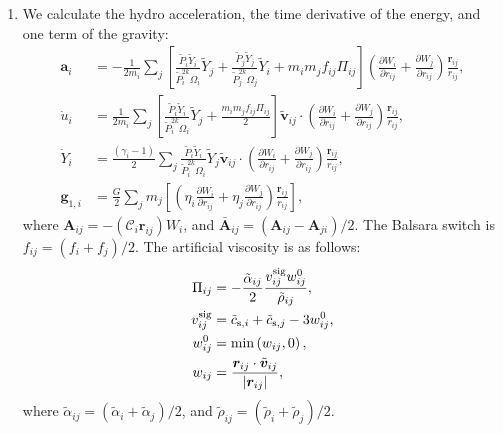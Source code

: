 \documentclass[fleqn,dvipdfmx]{article}
\begin{document}
\begin{enumerate}
\item We calculate the hydro acceleration, the time derivative of the
  energy, and one term of the gravity:
  \begin{align}
    \bm{a}_i &= - \frac{1}{2m_i} \sum_j \left[ \frac{\tilde{P}_i
        \tilde{Y}_i}{\tilde{P}_i^{2k} \Omega_i} \tilde{Y}_j +
      \frac{\tilde{P}_j \tilde{Y}_j}{\tilde{P}_j^{2k} \Omega_j}
      \tilde{Y}_i + m_i m_j f_{ij} \Pi_{ij} \right] \left(
    \frac{\partial W_i}{\partial r_{ij}} + \frac{\partial
      W_j}{\partial r_{ij}} \right) \frac{\bm{r}_{ij}}{r_{ij}}, \\
    \dot{u}_i &= \frac{1}{2m_i} \sum_j \left[ \frac{\tilde{P}_i
        \tilde{Y}_i}{\tilde{P}_i^{2k} \Omega_i} \tilde{Y}_j +
      \frac{m_i m_j f_{ij} \Pi_{ij}}{2} \right] \tilde{\bm{v}}_{ij}
    \cdot \left( \frac{\partial W_i}{\partial r_{ij}} + \frac{\partial
      W_j}{\partial r_{ij}} \right) \frac{\bm{r}_{ij}}{r_{ij}}, \\
    \dot{Y}_i &= \frac{(\gamma_i - 1)}{2} \sum_j \frac{\tilde{P}_i
      \tilde{Y}_i}{\tilde{P}_i^{2k} \Omega_i} \tilde{Y}_j
    \tilde{\bm{v}}_{ij} \cdot \left( \frac{\partial W_i}{\partial
      r_{ij}} + \frac{\partial W_j}{\partial r_{ij}} \right)
    \frac{\bm{r}_{ij}}{r_{ij}}, \\
    \bm{g}_{1,i} &= \frac{G}{2} \sum_j m_j \left[ \left( \eta_i
      \frac{\partial W_{i}}{\partial r_{ij}} + \eta_j \frac{\partial
        W_{j}}{\partial r_{ij}} \right) \frac{\bm{r}_{ij}}{r_{ij}}
      \right],
\end{align}
  where $\bm{A}_{ij}=- \left( \mathcal{C}_i \bm{r}_{ij} \right) W_i$,
  and $\bar{\bm{A}}_{ij}=\left( \bm{A}_{ij} - \bm{A}_{ji}
  \right)/2$. The Balsara switch is $f_{ij} = (f_i + f_j)/2$. The
  artificial viscosity is as follows:
  \begin{align}
    \Pi_{ij} &= - \frac{\tilde{\alpha}_{ij}}{2} \frac{v_{ij}^{\rm sig}
      w_{ij}^0}{\tilde{\rho}_{ij}}, \\
    v_{ij}^{\rm sig} &= \tilde{c}_{{\rm s},i} + \tilde{c}_{{\rm s},j}
    - 3w_{ij}^0, \\
    w_{ij}^0 &= \min \left(w_{ij},0\right), \\
    w_{ij} &= \frac{\bm{r}_{ij} \cdot
      \tilde{\bm{v}}_{ij}}{|\bm{r}_{ij}|},
  \end{align}
  where $\tilde{\alpha}_{ij}=(\tilde{\alpha}_i+\tilde{\alpha}_j)/2$,
  and $\tilde{\rho}_{ij}=(\tilde{\rho}_i+\tilde{\rho}_j)/2$.


\end{enumerate}
\end{document}
